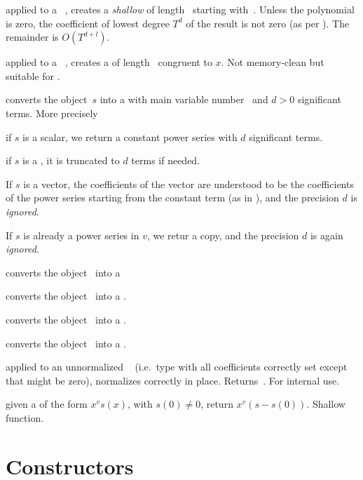  applied to a ~,
creates a \emph{shallow}  of length~ starting with~.
Unless the polynomial is zero, the coefficient of lowest degree
$T^d$ of the result is not zero (as per ). The
remainder is $O(T^{d+l})$.

 applied to a ~,
creates a  of length~ congruent to $x$. Not memory-clean
but suitable for .

 converts the object~$s$ into
a  with main variable number~ and $d > 0$ significant terms.
More precisely

\item if $s$ is a scalar,  we return a constant power series with $d$
significant terms.

\item if $s$ is a , it is truncated to $d$ terms if needed.

\item If $s$ is a vector, the coefficients of the vector  are understood to
be the coefficients of the power series starting from the constant term (as
in ), and the precision $d$ is \emph{ignored}.

\item If $s$ is already a power series in $v$, we retur a copy, and
the precision $d$ is again \emph{ignored}.

 converts the object~ into a 

 converts the object~ into a .

 converts the object~ into a .

 converts the object~ into a
.

 applied to an unnormalized ~
(i.e.~type  with all coefficients correctly set except that 
might be zero), normalizes  correctly in place. Returns~.
For internal use.

 given a  of the form $x^v s(x)$, with
$s(0)\neq 0$, return $x^v(s - s(0))$. Shallow function.

\section{Constructors}

